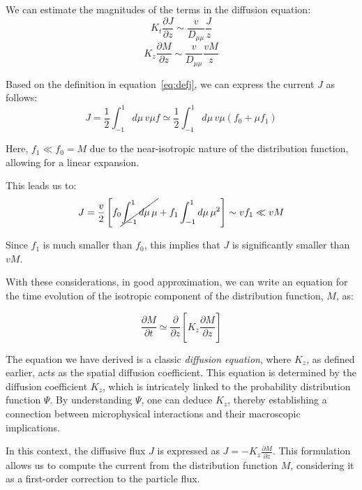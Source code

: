 
We can estimate the magnitudes of the terms in the diffusion equation:
%
\begin{equation}
K_t \frac{\partial J}{\partial z}\sim \frac{v}{D_{\mu\mu}}\frac{J}{z}
\end{equation}
\begin{equation}
K_z\frac{\partial M}{\partial z} \sim \frac{v}{D_{\mu\mu}}\frac{vM}{z}
\end{equation}

Based on the definition in equation~\eqref{eq:defj}, we can express the current \( J \) as follows:
%
\begin{equation}
J = \frac{1}{2} \int_{-1}^1 d\mu \, v\mu f \simeq \frac{1}{2} \int_{-1}^1 d\mu \, v\mu (f_0 + \mu f_1) 
\end{equation}

Here, \( f_1 \ll f_0 = M \) due to the near-isotropic nature of the distribution function, allowing for a linear expansion.

This leads us to:
%
\begin{equation}
J = \frac{v}{2} \left[ f_0 \cancel{\int_{-1}^1 d\mu \, \mu} + f_1 \int_{-1}^1 d\mu \, \mu^2 \right] \sim v f_1 \ll v M
\end{equation}

Since \( f_1 \) is much smaller than \( f_0 \), this implies that \( J \) is significantly smaller than \( vM \).

With these considerations, in good approximation, we can write an equation for the time evolution of the isotropic component of the distribution function, \( M \), as:
%
\begin{remark}
\begin{equation}
\frac{\partial M}{\partial t} \simeq \frac{\partial}{\partial z}\left[K_z \frac{\partial M}{\partial z}  \right]
\end{equation}
\end{remark}

The equation we have derived is a classic \emph{diffusion equation}, where \( K_z \), as defined earlier, acts as the spatial diffusion coefficient. This equation is determined by the diffusion coefficient \( K_z \), which is intricately linked to the probability distribution function \( \Psi \). By understanding \( \Psi \), one can deduce \( K_z \), thereby establishing a connection between microphysical interactions and their macroscopic implications.

In this context, the diffusive flux \( J \) is expressed as \( J = -K_z \frac{\partial M}{\partial z} \). This formulation allows us to compute the current from the distribution function \( M \), considering it as a first-order correction to the particle flux. 

